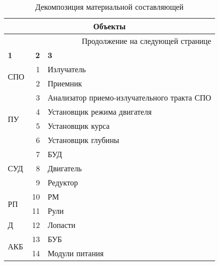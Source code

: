 \begin{longtable}{|l|r|m{}|}
  \caption{Декомпозиция материальной составляющей}\label{tbl:model_anpa_objects}\\
  \toprule
  \multicolumn{3}{|c|}{\textbf{Объекты}} \\
  \midrule
  \endhead
  \midrule
  \multicolumn{3}{r}{Продолжение на следующей странице} \\
  \midrule
  \endfoot
  \bottomrule
  \endlastfoot
  \textbf{1} & \textbf{2} & \textbf{3} \\\hline
  \multirow{2}{.25\textwidth}{СПО} & 1 & Излучатель \\\cline{2-3}
                                   & 2 & Приемник \\\hline
  \multirow{4}{.25\textwidth}{ПУ} & 3 & Анализатор приемо-излучательного тракта СПО \\\cline{2-3}
                                  & 4 & Установщик режима двигателя \\\cline{2-3}
                                  & 5 & Установщик курса \\\cline{2-3}
                                  & 6 & Установщик глубины \\\hline
  \multirow{3}{.25\textwidth}{СУД} & 7 & БУД \\\cline{2-3}
                                   & 8 & Двигатель \\\cline{2-3}
                                   & 9 & Редуктор \\\hline
  \multirow{2}{.25\textwidth}{РП}  & 10 & РМ \\\cline{2-3}
                                   & 11 & Рули \\\hline
                                 Д & 12 & Лопасти \\\hline
  \multirow{2}{.25\textwidth}{АКБ} & 13 & БУБ \\\cline{2-3}
                                  & 14 & Модули питания \\
  \end{longtable}
  
